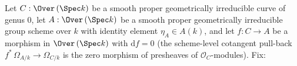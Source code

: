 \begin{theorem}
  Let \(C : \Over\,(\Spec k)\) be a smooth proper geometrically irreducible curve of genus \(0\), let \(A : \Over\,(\Spec k)\) be a smooth proper geometrically irreducible group scheme over \(k\) with identity element \(\eta_A \in A(k)\), and let \(f \colon C \to A\) be a morphism in \(\Over\,(\Spec k)\) with \(\mathrm df = 0\) (the scheme-level cotangent pull-back \(f^{*}\,\Omega_{A/k} \to \Omega_{C/k}\) is the zero morphism of presheaves of \(\mathcal O_C\)-modules). Fix:

\end{theorem}
